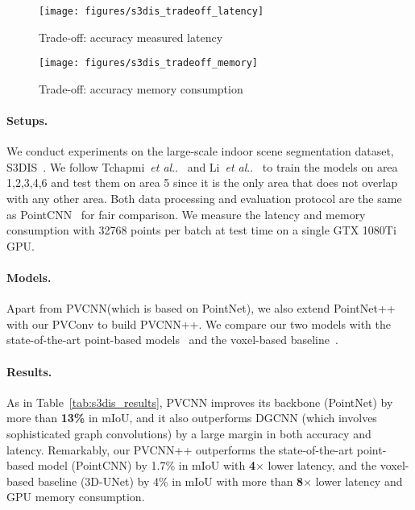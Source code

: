 \documentclass{article}
\makeatletter
\newcommand{\tab}[1]{Table~\ref{#1}}
\DeclareRobustCommand\onedot{\futurelet\@let@token\@onedot}
\def\@onedot{\ifx\@let@token.\else.\null\fi\xspace}
\def\etal{\emph{et al}\onedot}
\newcommand{\myparagraph}[1]{\vspace{-6pt}\paragraph{#1}}
\def\modelshort{PVCNN\xspace}
\def\modelshortp{PVCNN++\xspace}
\def\convshort{PVConv\xspace}
\makeatother
\begin{document}
\begin{table*}[t]
\label{tab:s3dis_results}
\vspace{-6pt}
\end{table*} \begin{figure*}[!t]
\centering
\begin{subfigure}{0.49\textwidth}
    \centering
    \texttt{[image: figures/s3dis\_tradeoff\_latency]}
    \caption{Trade-off: accuracy \vs measured latency}
\end{subfigure}
\hfill
\begin{subfigure}{0.49\textwidth}
    \centering
    \texttt{[image: figures/s3dis\_tradeoff\_memory]}
    \caption{Trade-off: accuracy \vs memory consumption}
\end{subfigure}
\caption{Comparisons between \modelshort and point/voxel-based baselines on S3DIS.}
\label{fig:s3dis_tradeoffs}
\vspace{-10pt}
\end{figure*}
 
\paragraph{Setups.}

We conduct experiments on the large-scale indoor scene segmentation dataset, S3DIS~\cite{Armeni:2017is,Armeni:2016sd}. We follow Tchapmi~\etal~\cite{Tchapmi:2017sc} and Li~\etal~\cite{Li:2018tp} to train the models on area 1,2,3,4,6 and test them on area 5 since it is the only area that does not overlap with any other area. Both data processing and evaluation protocol are the same as PointCNN~\cite{Li:2018tp} for fair comparison. We measure the latency and memory consumption with 32768 points per batch at test time on a single GTX 1080Ti GPU.

\myparagraph{Models.}

Apart from \modelshort (which is based on PointNet), we also extend PointNet++~\cite{Qi:2017tf} with our \convshort to build \modelshortp. We compare our two models with the state-of-the-art point-based models~\cite{Qi:2017vq,Huang:2018rs, Wang:2018dg, Li:2018tp} and the voxel-based baseline~\cite{Cicek:2016un}.

\myparagraph{Results.}

As in \tab{tab:s3dis_results}, \modelshort improves its backbone (PointNet) by more than \textbf{13\%} in mIoU, and it also outperforms DGCNN (which involves sophisticated graph convolutions) by a large margin in both accuracy and latency. Remarkably, our \modelshortp outperforms the state-of-the-art point-based model (PointCNN) by 1.7\% in mIoU with \textbf{4}$\times$ lower latency, and the voxel-based baseline (3D-UNet) by 4\% in mIoU with more than \textbf{8$\times$} lower latency and GPU memory consumption.
\end{document}
